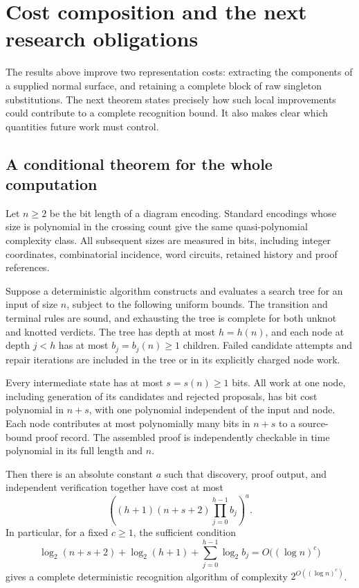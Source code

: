 \section{Cost composition and the next research obligations}
\label{sec:research-agenda}

The results above improve two representation costs: extracting the
components of a supplied normal surface, and retaining a complete block
of raw singleton substitutions. The next theorem states precisely how
such local improvements could contribute to a complete recognition bound.
It also makes clear which quantities future work must control.

\subsection{A conditional theorem for the whole computation}

Let $n\ge2$ be the bit length of a diagram encoding. Standard encodings
whose size is polynomial in the crossing count give the same
quasi-polynomial complexity class. All subsequent sizes are measured in
bits, including integer coordinates, combinatorial incidence, word
circuits, retained history and proof references.

\begin{proposition}
\label{prop:conditional-cost-composition}
Suppose a deterministic algorithm constructs and evaluates a search tree
for an input of size $n$, subject to the following uniform bounds.
The transition and terminal rules are sound, and exhausting the tree is
complete for both unknot and knotted verdicts. The tree has depth at most
$h=h(n)$, and each node at depth $j<h$ has at most $b_j=b_j(n)\ge1$
children. Failed candidate attempts and repair iterations are included
in the tree or in its explicitly charged node work.

Every intermediate state has at most $s=s(n)\ge1$ bits. All work at
one node, including generation of its candidates and rejected proposals,
has bit cost polynomial in $n+s$, with one polynomial independent of the
input and node. Each node contributes at most polynomially many bits in
$n+s$ to a source-bound proof record. The assembled proof is independently
checkable in time polynomial in its full length and $n$.

Then there is an absolute constant $a$ such that discovery, proof output,
and independent verification together have cost at most
\begin{equation}\label{eq:global-composition-cost}
 \left((h+1)(n+s+2)\prod_{j=0}^{h-1}b_j\right)^a.
\end{equation}
In particular, for a fixed $c\ge1$, the sufficient condition
\begin{equation}\label{eq:global-log-budget}
 \log_2(n+s+2)+\log_2(h+1)
       +\sum_{j=0}^{h-1}\log_2 b_j
       =O\bigl((\log n)^c\bigr)
\end{equation}
gives a complete deterministic recognition algorithm of complexity
$2^{O((\log n)^c)}$.
\end{proposition}

